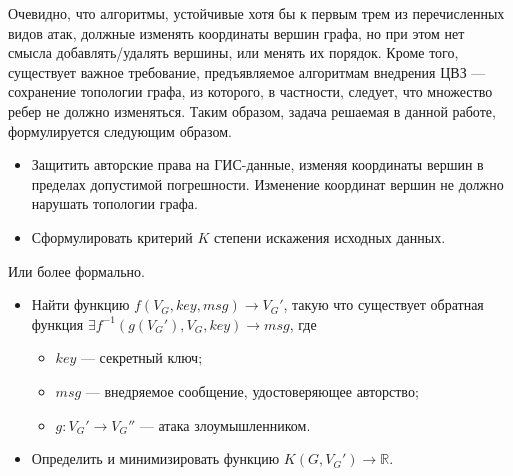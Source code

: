 Очевидно, что алгоритмы, устойчивые хотя бы к первым трем из перечисленных видов атак, должные изменять координаты вершин графа, 
но при этом нет смысла добавлять/удалять вершины, или менять их порядок. 
Кроме того, существует важное требование, предъявляемое алгоритмам внедрения ЦВЗ --- сохранение топологии графа, из которого, в частности, следует,
что множество ребер не должно изменяться.
Таким образом, задача решаемая в данной работе, формулируется следующим образом. 
\begin{itemize}
    \item Защитить авторские права на ГИС-данные, изменяя координаты вершин в пределах допустимой погрешности. 
    Изменение координат вершин не должно нарушать топологии графа.
    \item Сформулировать критерий $K$ степени искажения исходных данных.
\end{itemize}
Или более формально.
\begin{itemize}
    \item Найти функцию $f(V_G, key, msg) \to V_G'$, такую что существует обратная функция $\exists f^{-1}(g(V_G'), V_G, key) \to msg$, где
    \begin{itemize}
        \item $key$ --- секретный ключ;
        \item $msg$ --- внедряемое сообщение, удостоверяющее авторство;
        \item $g: V_G' \to V_G''$ --- атака злоумышленником.
    \end{itemize}
    \item Определить и минимизировать функцию $K(G, V_G') \to \mathbb{R}$.
\end{itemize}
